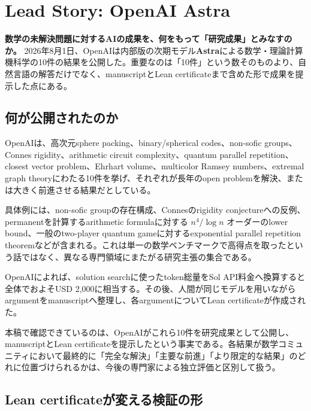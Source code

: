 \section{Lead Story: OpenAI Astra}
\label{sec:astra-lead}

\textbf{数学の未解決問題に対するAIの成果を、何をもって「研究成果」とみなすのか。}
2026年8月1日、OpenAIは内部版の次期モデル\textbf{Astra}による数学・理論計算機科学の10件の結果を公開した\cite{openai-astra-ten-advances}。重要なのは「10件」という数そのものより、自然言語の解答だけでなく、manuscriptとLean certificateまで含めた形で成果を提示した点にある。

\subsection*{何が公開されたのか}

OpenAIは、高次元sphere packing、binary/spherical codes、non-sofic groups、Connes rigidity、arithmetic circuit complexity、quantum parallel repetition、closest vector problem、Ehrhart volume、multicolor Ramsey numbers、extremal graph theoryにわたる10件を挙げ、それぞれが長年のopen problemを解決、または大きく前進させる結果だとしている\cite{openai-astra-ten-advances}。

具体例には、non-sofic groupの存在構成、Connesのrigidity conjectureへの反例、permanentを計算するarithmetic formulaに対する $n^4/\log n$ オーダーのlower bound、一般のtwo-player quantum gameに対するexponential parallel repetition theoremなどが含まれる\cite{openai-astra-ten-advances}。これは単一の数学ベンチマークで高得点を取ったという話ではなく、異なる専門領域にまたがる研究主張の集合である。

OpenAIによれば、solution searchに使ったtoken総量をSol API料金へ換算すると全体でおよそUSD 2,000に相当する。その後、人間が同じモデルを用いながらargumentをmanuscriptへ整理し、各argumentについてLean certificateが作成された\cite{openai-astra-ten-advances}。

\begin{claimboundary}[OpenAIの主張と独立評価を分ける]
本稿で確認できているのは、OpenAIがこれら10件を研究成果として公開し、manuscriptとLean certificateを提示したという事実である\cite{openai-astra-ten-advances}。各結果が数学コミュニティにおいて最終的に「完全な解決」「主要な前進」「より限定的な結果」のどれに位置づけられるかは、今後の専門家による独立評価と区別して扱う。
\end{claimboundary}

\subsection*{Lean certificateが変える検証の形}

